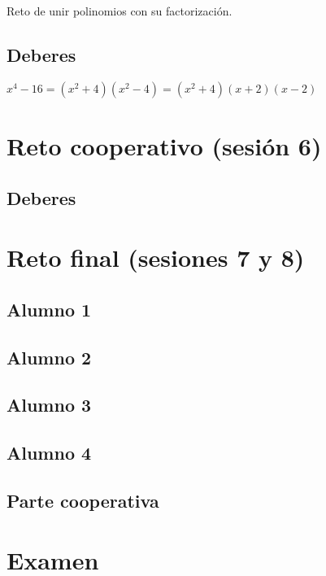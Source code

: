 Reto de unir polinomios con su factorización.

\subsection{Deberes}
\label{ses4:deberes}

$x^4-16 = (x^2+4)(x^2-4) = (x^2+4)(x+2)(x-2)$

\section{Reto cooperativo (sesión 6)}
\label{ses6:coop}

\subsection{Deberes}
\label{ses6:deberes}



\section{Reto final (sesiones 7 y 8)}
\label{ses7:indiv}

\subsection{Alumno 1}


\subsection{Alumno 2}


\subsection{Alumno 3}


\subsection{Alumno 4}



\subsection{Parte cooperativa}
\label{ses7:coop}


\section{Examen}
\label{examen}